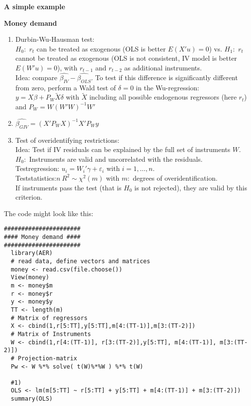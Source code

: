 \begin{Solution}{13.4}
\textbf{A simple example}
\end{Solution}
\begin{Solution}{13.5}
\textbf{Money demand}
\begin{enumerate}
  \item Durbin-Wu-Hausman test: \\
  $H_0:$ $r_t$ can be treated as exogenous (OLS is better $E(X'u)=0$) vs.
      $H_1:$ $r_t$ cannot be treated as exogenous (OLS is not consistent,
      IV model is better $E(W'u)=0$), with $r_{t-1}$ and $r_{t-2}$ as
      additional instruments.\\
      Idea: compare $\widehat{\beta_{IV}} -
      \widehat{\beta_{OLS}}$. To test if this difference is significantly
      different from zero, perform a Wald test of $\delta=0$ in the
      Wu-regression: $y=X\beta + P_W \widetilde{X}\delta$ with
      $\widetilde{X}$ including all possible endogenous regressors (here
      $r_t$) and $P_W = W(W'W)^{-1}W'$
  \item $\widehat{\beta_{GIV}} = (X'P_WX)^{-1}X'P_Wy$
  \item Test of overidentifying restrictions: \\
  Idea: Test if IV residuals can be explained by the full set of
      instruments $W$.\\ $H_0:$ Instruments are valid and uncorrelated
      with the residuals. \\Testregression: $u_i=W_i'\gamma +
      \varepsilon_i$ with $i=1,\dots,n$. \\Teststatistics:$n~R^2 \sim
      \chi^2(m)$ with $m:$ degrees of overidentification. \\If
      instruments pass the test (that is $H_0$ is not rejected), they are
      valid by this criterion.
\end{enumerate}
The code might look like this:
\begin{verbatim}
######################
#### Money demand ####
######################
  library(AER)
  # read data, define vectors and matrices
  money <- read.csv(file.choose())
  View(money)
  m <- money$m
  r <- money$r
  y <- money$y
  TT <- length(m)
  # Matrix of regressors
  X <- cbind(1,r[5:TT],y[5:TT],m[4:(TT-1)],m[3:(TT-2)])
  # Matrix of Instruments
  W <- cbind(1,r[4:(TT-1)], r[3:(TT-2)],y[5:TT], m[4:(TT-1)], m[3:(TT-2)])
  # Projection-matrix
  Pw <- W %*% solve( t(W)%*%W ) %*% t(W)

  #1)
  OLS <- lm(m[5:TT] ~ r[5:TT] + y[5:TT] + m[4:(TT-1)] + m[3:(TT-2)])
  summary(OLS)


\end{verbatim}
\end{Solution}
